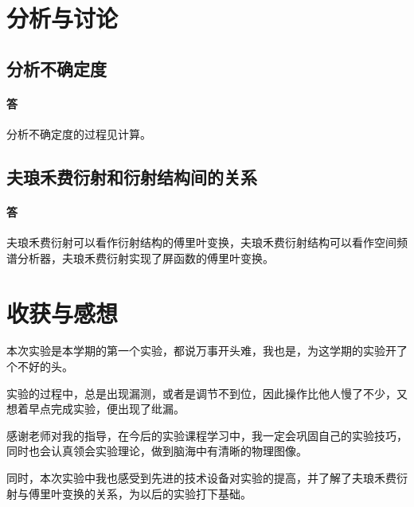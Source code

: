 \documentclass{ctexart}
\begin{document}
\section{分析与讨论}
\subsection{分析不确定度}
\paragraph{答}分析不确定度的过程见计算。
\subsection{夫琅禾费衍射和衍射结构间的关系}
\paragraph{答}夫琅禾费衍射可以看作衍射结构的傅里叶变换，夫琅禾费衍射结构可以看作空间频谱分析器，夫琅禾费衍射实现了屏函数的傅里叶变换。





      \section{收获与感想}
      本次实验是本学期的第一个实验，都说万事开头难，我也是，为这学期的实验开了个不好的头。

      实验的过程中，总是出现漏测，或者是调节不到位，因此操作比他人慢了不少，又想着早点完成实验，便出现了纰漏。

      感谢老师对我的指导，在今后的实验课程学习中，我一定会巩固自己的实验技巧，同时也会认真领会实验理论，做到脑海中有清晰的物理图像。

      同时，本次实验中我也感受到先进的技术设备对实验的提高，并了解了夫琅禾费衍射与傅里叶变换的关系，为以后的实验打下基础。
\end{document}
